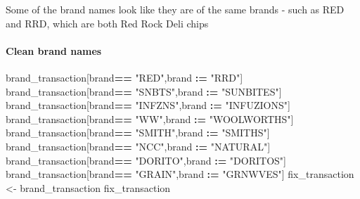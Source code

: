 \documentclass[
]{article}
\newenvironment{Shaded}{\begin{snugshade}}{\end{snugshade}}
\newcommand{\NormalTok}[1]{#1}
\newcommand{\OtherTok}[1]{\textcolor[rgb]{0.56,0.35,0.01}{#1}}
\newcommand{\SpecialCharTok}[1]{\textcolor[rgb]{0.81,0.36,0.00}{\textbf{#1}}}
\newcommand{\StringTok}[1]{\textcolor[rgb]{0.31,0.60,0.02}{#1}}
\begin{document}
Some of the brand names look like they are of the same brands - such as
RED and RRD, which are both Red Rock Deli chips

\hypertarget{clean-brand-names}{%
\paragraph{Clean brand names}\label{clean-brand-names}}

\begin{Shaded}
\begin{Highlighting}[]
\NormalTok{brand\_transaction[brand}\SpecialCharTok{==} \StringTok{"RED"}\NormalTok{,brand }\SpecialCharTok{:=} \StringTok{"RRD"}\NormalTok{] }
\NormalTok{brand\_transaction[brand}\SpecialCharTok{==} \StringTok{"SNBTS"}\NormalTok{,brand }\SpecialCharTok{:=} \StringTok{"SUNBITES"}\NormalTok{] }
\NormalTok{brand\_transaction[brand}\SpecialCharTok{==} \StringTok{"INFZNS"}\NormalTok{,brand }\SpecialCharTok{:=} \StringTok{"INFUZIONS"}\NormalTok{] }
\NormalTok{brand\_transaction[brand}\SpecialCharTok{==} \StringTok{"WW"}\NormalTok{,brand }\SpecialCharTok{:=} \StringTok{"WOOLWORTHS"}\NormalTok{] }
\NormalTok{brand\_transaction[brand}\SpecialCharTok{==} \StringTok{"SMITH"}\NormalTok{,brand }\SpecialCharTok{:=} \StringTok{"SMITHS"}\NormalTok{] }
\NormalTok{brand\_transaction[brand}\SpecialCharTok{==} \StringTok{"NCC"}\NormalTok{,brand }\SpecialCharTok{:=} \StringTok{"NATURAL"}\NormalTok{] }
\NormalTok{brand\_transaction[brand}\SpecialCharTok{==} \StringTok{"DORITO"}\NormalTok{,brand }\SpecialCharTok{:=} \StringTok{"DORITOS"}\NormalTok{] }
\NormalTok{brand\_transaction[brand}\SpecialCharTok{==} \StringTok{"GRAIN"}\NormalTok{,brand }\SpecialCharTok{:=} \StringTok{"GRNWVES"}\NormalTok{]}
\NormalTok{fix\_transaction }\OtherTok{\textless{}{-}}\NormalTok{ brand\_transaction}
\NormalTok{fix\_transaction}
\end{Highlighting}
\end{Shaded}
\end{document}
